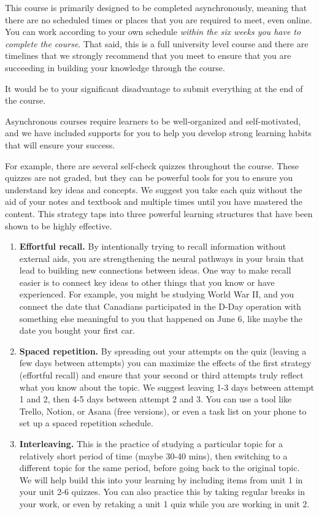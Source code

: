 \documentclass[
]{book}
\providecommand{\tightlist}{%
  \setlength{\itemsep}{0pt}\setlength{\parskip}{0pt}}
\begin{document}
This course is primarily designed to be completed asynchronously, meaning that there are no scheduled times or places that you are required to meet, even online. You can work according to your own schedule \emph{within the six weeks you have to complete the course}. That said, this is a full university level course and there are timelines that we strongly recommend that you meet to ensure that you are succeeding in building your knowledge through the course.

It would be to your significant disadvantage to submit everything at the end of the course.

Asynchronous courses require learners to be well-organized and self-motivated, and we have included supports for you to help you develop strong learning habits that will ensure your success.

For example, there are several self-check quizzes throughout the course. These quizzes are not graded, but they can be powerful tools for you to ensure you understand key ideas and concepts. We suggest you take each quiz without the aid of your notes and textbook and multiple times until you have mastered the content. This strategy taps into three powerful learning structures that have been shown to be highly effective.

\begin{enumerate}
\def\labelenumi{\arabic{enumi}.}
\tightlist
\item
  \textbf{Effortful recall.} By intentionally trying to recall information without external aids, you are strengthening the neural pathways in your brain that lead to building new connections between ideas. One way to make recall easier is to connect key ideas to other things that you know or have experienced. For example, you might be studying World War II, and you connect the date that Canadians participated in the D-Day operation with something else meaningful to you that happened on June 6, like maybe the date you bought your first car.\\
\item
  \textbf{Spaced repetition.} By spreading out your attempts on the quiz (leaving a few days between attempts) you can maximize the effects of the first strategy (effortful recall) and ensure that your second or third attempts truly reflect what you know about the topic. We suggest leaving 1-3 days between attempt 1 and 2, then 4-5 days between attempt 2 and 3. You can use a tool like Trello, Notion, or Asana (free versions), or even a task list on your phone to set up a spaced repetition schedule.\\
\item
  \textbf{Interleaving.} This is the practice of studying a particular topic for a relatively short period of time (maybe 30-40 mins), then switching to a different topic for the same period, before going back to the original topic. We will help build this into your learning by including items from unit 1 in your unit 2-6 quizzes. You can also practice this by taking regular breaks in your work, or even by retaking a unit 1 quiz while you are working in unit 2.
\end{enumerate}
\end{document}
